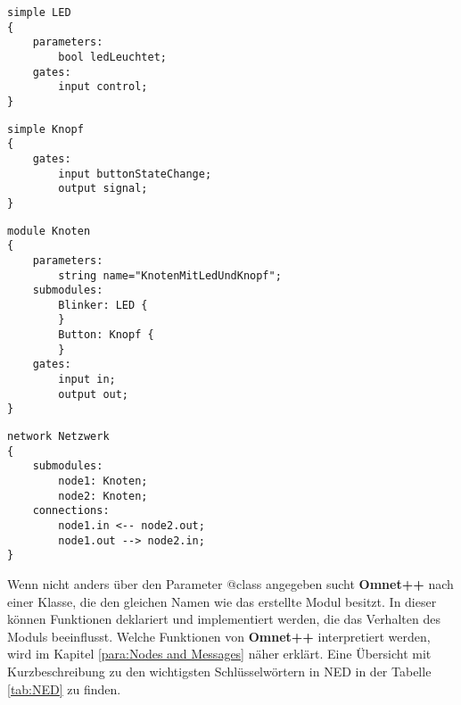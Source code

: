 \begin{minipage}{\textwidth}
\begin{lstlisting}[language=ned,caption={einfaches Modul: LED},label=lst:simpleNodeLed]
simple LED
{
	parameters:
		bool ledLeuchtet;
	gates:
		input control;
}
\end{lstlisting}
\end{minipage}
\begin{minipage}{\textwidth}
\begin{lstlisting}[language=ned,caption={einfaches Modul: Knopf},label=lst:simpleNodeButton]
simple Knopf
{
	gates:
		input buttonStateChange;
		output signal;
}
\end{lstlisting}
\end{minipage}
\begin{minipage}{\textwidth}
\begin{lstlisting}[language=ned,caption={Compound Modul},label=lst:simpleNode]
module Knoten
{
	parameters:
		string name="KnotenMitLedUndKnopf";
	submodules:
		Blinker: LED {
		}
		Button: Knopf {
		}
	gates:
		input in;
		output out;
}
\end{lstlisting}
\end{minipage}
\begin{minipage}{\textwidth}
\begin{lstlisting}[language=ned,caption={einfaches Netzwerk},label=lst:simpleNetwork]
network Netzwerk
{
	submodules:
		node1: Knoten;
		node2: Knoten;
	connections:
		node1.in <-- node2.out;
		node1.out --> node2.in;
}
\end{lstlisting}
\end{minipage}
Wenn nicht anders über den Parameter @class angegeben sucht \textbf{Omnet++} nach einer Klasse, die den gleichen Namen wie das erstellte Modul besitzt. In dieser können Funktionen deklariert und implementiert werden, die das Verhalten des Moduls beeinflusst. Welche Funktionen von \textbf{Omnet++} interpretiert werden, wird im Kapitel \ref{para:Nodes and Messages} näher erklärt.
Eine Übersicht mit Kurzbeschreibung zu den wichtigsten Schlüsselwörtern in NED in der Tabelle \ref{tab:NED} zu finden.

